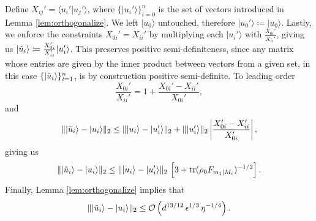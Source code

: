 Define $X_{ij}'=\langle u_i' \vert u_j'\rangle$, where $\{\vert u_i' \rangle\}_{i=0}^{n}$ is the set of vectors introduced in Lemma \ref{lem:orthogonalize}. We left $\vert u_0 \rangle$ untouched, therefore $\vert u_0' \rangle \coloneqq \vert u_0 \rangle$. 
Lastly, we enforce the constraints $X_{0i}'=X_{ii}'$ by multiplying each $\vert u_i' \rangle$ with $\frac{X_{0i}'}{X_{ii}'}$, giving us $\vert \Tilde{u}_i \rangle \coloneqq \frac{X_{0i}'}{X_{ii}'} \vert u_i' \rangle$. This preserves positive semi-definiteness, since any matrix whose entries are given by the inner product between vectors from a given set, in this case $\{\vert \Tilde{u}_i \rangle\}_{i=1}^n$, is by construction positive semi-definite. To leading order \[\frac{X_{0i}'}{X_{ii}'}=1+\frac{X_{0i}'-X_{ii}'}{X_{0i}'},\]
and \[\|\vert \Tilde{u}_i \rangle - \vert u_i \rangle\|_2 \leq \|\vert u_i \rangle -\vert u_i' \rangle\|_2+\|\vert u_i'\rangle\|_2 \left| \frac{X_{0i}'-X_{ii}'}{X_{0i}'} \right|,\]
giving us \[\|\vert \Tilde{u}_i \rangle - \vert u_i \rangle\|_2\leq \|\vert u_i \rangle -\vert u_i' \rangle\|_2\,\left[3+\operatorname{tr}(\rho_0 F_{m_1\vert M_i})^{-1/2}\right].\]
Finally, Lemma \ref{lem:orthogonalize} implies that \[\|\vert \Tilde{u}_i \rangle - \vert u_i \rangle\|_2 \leq \mathcal{O}\left(d^{13/12}\,\epsilon^{1/3}\,\eta^{-1/4}\right). \]